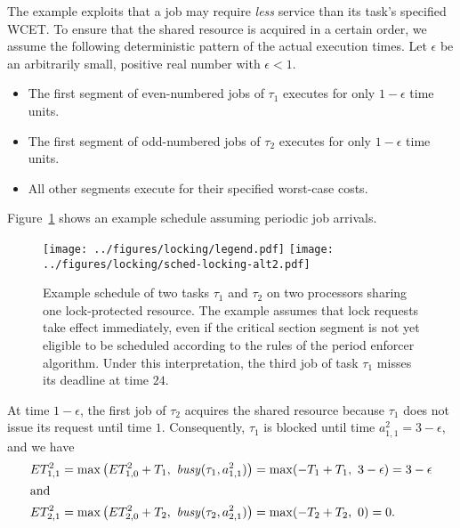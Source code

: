 The example exploits that a job may require \emph{less} service than its task's specified WCET. To ensure that the shared resource is acquired in a certain order, we assume the following deterministic pattern of the actual execution times. Let $\epsilon$ be an arbitrarily small, positive real number with $\epsilon <1$. 
\begin{itemize}
	\item The first segment of even-numbered jobs  of $\tau_1$ executes for only $1-\epsilon$ time units.
	\item The first segment of odd-numbered jobs of $\tau_2$ executes for only $1-\epsilon$ time units.
	\item All other segments execute for their specified worst-case costs.
\end{itemize}
Figure~\ref{fig:locking-alt2} shows an example schedule assuming periodic job arrivals.

\begin{figure}[t]
  \centering
  \texttt{[image: ../figures/locking/legend.pdf]}
  \texttt{[image: ../figures/locking/sched-locking-alt2.pdf]}
  \caption{Example schedule of two tasks $\tau_1$ and $\tau_2$ on two processors sharing one lock-protected resource. The example assumes that lock requests take effect immediately, even if the critical section segment is not yet eligible to be scheduled according to the rules of the period enforcer algorithm. Under this interpretation, the third job of task $\tau_1$ misses its deadline at time $24$.}
  \label{fig:locking-alt2}
\end{figure}


At time $1-\epsilon$, the first job of $\tau_2$ acquires the shared resource because $\tau_1$ does not issue its request until time $1$. Consequently, $\tau_1$ is blocked until time $a^2_{1,1} = 3 - \epsilon$, and we have
\begin{align*}
	ET_{1,1}^2 & = \max\left(ET_{1,0}^2 + T_1,\ \mathit{busy}(\tau_1, a^2_{1,1})\right) =\max(-T_1 + T_1,\ 3 - \epsilon) = 3 - \epsilon
\\ \intertext{and}
	ET_{2,1}^2 & = \max\left(ET_{2,0}^2 + T_2,\ \mathit{busy}(\tau_2, a^2_{2,1})\right) =\max(-T_2 + T_2,\ 0) = 0.
\end{align*}

